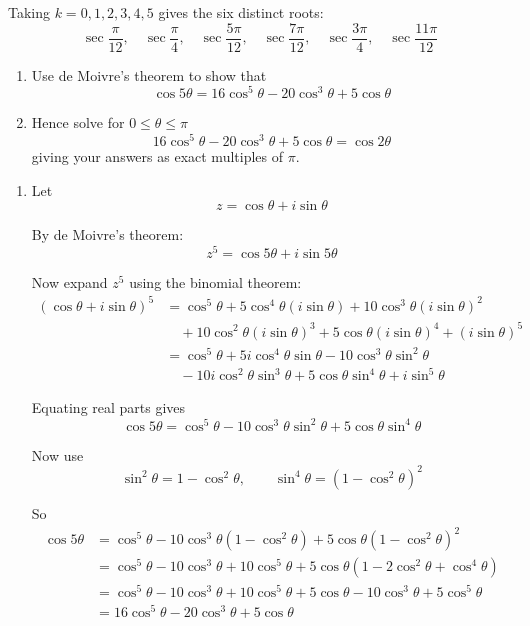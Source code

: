 \documentclass[leqno]{article}
\begin{document}
\begin{enumerate}[
  label=\textbf{\arabic*.},
  leftmargin=*,
  topsep=0pt,
  partopsep=0pt,
  parsep=0pt
]
\begin{djsSolution}
\begin{enumerate}[label=\textbf{(\alph*)}]
Taking \(k=0,1,2,3,4,5\) gives the six distinct roots:
\[
\sec\frac{\pi}{12},\quad
\sec\frac{\pi}{4},\quad
\sec\frac{5\pi}{12},\quad
\sec\frac{7\pi}{12},\quad
\sec\frac{3\pi}{4},\quad
\sec\frac{11\pi}{12}
\]
\end{enumerate}
\end{djsSolution}


\newpage

\questionitem

\begin{enumerate}[label=\textbf{(\alph*)}]
  \item Use de Moivre's theorem to show that
  \[
  \cos 5\theta = 16\cos^5 \theta - 20\cos^3 \theta + 5\cos \theta
  \]
  \item Hence solve for $0 \le \theta \le \pi$
  \[
  16\cos^5 \theta - 20\cos^3 \theta + 5\cos \theta = \cos 2\theta
  \]
  giving your answers as exact multiples of $\pi$.  \\
\end{enumerate}

\vspace*{10pt}

\begin{djsSolution}
\begin{enumerate}[label=\textbf{(\alph*)}]
  \item Let
\[
z=\cos\theta+i\sin\theta
\]

By de Moivre's theorem:
\[
z^5=\cos 5\theta+i\sin 5\theta
\]

Now expand \(z^5\) using the binomial theorem:
\begin{align*}
(\cos\theta+i\sin\theta)^5
&=\cos^5\theta+5\cos^4\theta(i\sin\theta)+10\cos^3\theta(i\sin\theta)^2 \\
&\quad +10\cos^2\theta(i\sin\theta)^3+5\cos\theta(i\sin\theta)^4+(i\sin\theta)^5 \\
&=\cos^5\theta+5i\cos^4\theta\sin\theta-10\cos^3\theta\sin^2\theta \\
&\quad -10i\cos^2\theta\sin^3\theta+5\cos\theta\sin^4\theta+i\sin^5\theta
\end{align*}

Equating real parts gives
\[
\cos 5\theta=\cos^5\theta-10\cos^3\theta\sin^2\theta+5\cos\theta\sin^4\theta
\]

Now use
\[
\sin^2\theta=1-\cos^2\theta,
\qquad
\sin^4\theta=(1-\cos^2\theta)^2
\]

So
\begin{align*}
\cos 5\theta
&=\cos^5\theta-10\cos^3\theta(1-\cos^2\theta)+5\cos\theta(1-\cos^2\theta)^2 \\
&=\cos^5\theta-10\cos^3\theta+10\cos^5\theta+5\cos\theta(1-2\cos^2\theta+\cos^4\theta) \\
&=\cos^5\theta-10\cos^3\theta+10\cos^5\theta+5\cos\theta-10\cos^3\theta+5\cos^5\theta \\
&=16\cos^5\theta-20\cos^3\theta+5\cos\theta
\end{align*}


\end{enumerate}
\end{djsSolution}
\end{enumerate}
\end{document}

